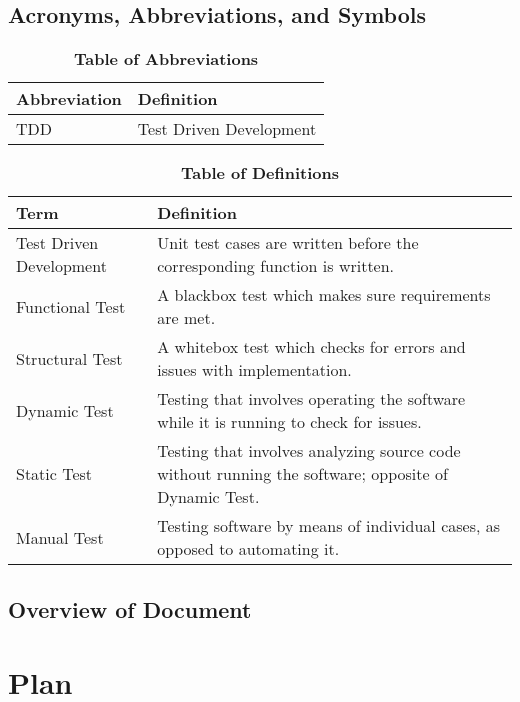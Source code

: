 \documentclass[12pt, titlepage]{article}
\begin{document}
\subsection{Acronyms, Abbreviations, and Symbols}

\begin{table}[hbp]
\caption{\textbf{Table of Abbreviations}} \label{Table}

\begin{tabularx}{\textwidth}{p{3cm}X}
\hline
\textbf{Abbreviation} & \textbf{Definition} \\
\hline
TDD & Test Driven Development\\
\hline
\end{tabularx}

\end{table}

\begin{table}[!htbp]
\caption{\textbf{Table of Definitions}} \label{Table}

\begin{tabularx}{\textwidth}{p{3cm}X}
\hline
\textbf{Term} & \textbf{Definition}\\
\hline
Test Driven Development & Unit test cases are written before the corresponding function is written.\\
Functional Test & A blackbox test which makes sure requirements are met.\\
Structural Test & A whitebox test which checks for errors and issues with implementation.\\
Dynamic Test & Testing that involves operating the software while it is running to check for issues.\\
Static Test & Testing that involves analyzing source code without running the software; opposite of Dynamic Test.\\
Manual Test & Testing software by means of individual cases, as opposed to automating it.\\
\hline
\end{tabularx}

\end{table}

\subsection{Overview of Document}

\section{Plan}
\end{document}
